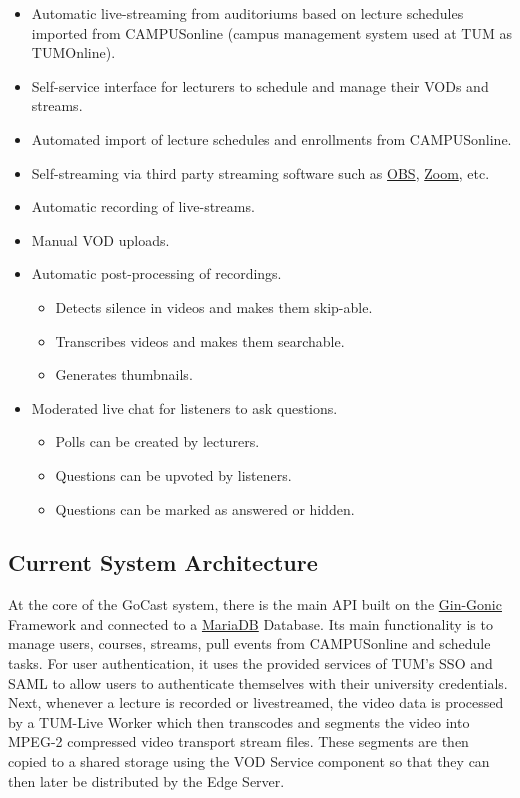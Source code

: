 \begin{itemize}
    \item Automatic live-streaming from auditoriums based on lecture schedules imported from CAMPUSonline (campus management system used at \ac{TUM} as TUMOnline).
    \item Self-service interface for lecturers to schedule and manage their \ac{VOD}s and streams.
    \item Automated import of lecture schedules and enrollments from CAMPUSonline.
    \item Self-streaming via third party streaming software such as \href{https://obsproject.com/}{OBS}, \href{https://zoom.us}{Zoom}, etc.
    \item Automatic recording of live-streams.
    \item Manual \ac{VOD} uploads.
    \item Automatic post-processing of recordings.
    \begin{itemize}
        \item Detects silence in videos and makes them skip-able.
        \item Transcribes videos and makes them searchable.
        \item Generates thumbnails.
    \end{itemize}
    \item Moderated live chat for listeners to ask questions.
    \begin{itemize}
        \item Polls can be created by lecturers.
        \item Questions can be upvoted by listeners.
        \item Questions can be marked as answered or hidden.
    \end{itemize}
\end{itemize}

\subsection{Current System Architecture}

At the core of the GoCast system, there is the main \ac{API} built on the \href{https://github.com/gin-gonic/gin}{Gin-Gonic} Framework and connected to a \href{https://mariadb.org/}{MariaDB} Database. Its main functionality is to manage users, courses, streams, pull events from CAMPUSonline and schedule tasks. For user authentication, it uses the provided services of \ac{TUM}'s \ac{SSO} and \ac{SAML} to allow users to authenticate themselves with their university credentials. 
Next, whenever a lecture is recorded or livestreamed, the video data is processed by a TUM-Live Worker which then transcodes and segments the video into MPEG-2 compressed video transport stream files. These segments are then copied to a shared storage using the VOD Service component so that they can then later be distributed by the Edge Server.

